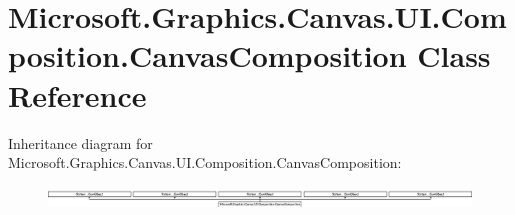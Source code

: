 \hypertarget{class_microsoft_1_1_graphics_1_1_canvas_1_1_u_i_1_1_composition_1_1_canvas_composition}{}\section{Microsoft.\+Graphics.\+Canvas.\+U\+I.\+Composition.\+Canvas\+Composition Class Reference}
\label{class_microsoft_1_1_graphics_1_1_canvas_1_1_u_i_1_1_composition_1_1_canvas_composition}
Inheritance diagram for Microsoft.\+Graphics.\+Canvas.\+U\+I.\+Composition.\+Canvas\+Composition\+:\begin{figure}[H]
\begin{center}
\leavevmode
\includegraphics[height=0.594164cm]{class_microsoft_1_1_graphics_1_1_canvas_1_1_u_i_1_1_composition_1_1_canvas_composition}
\end{center}
\end{figure}
